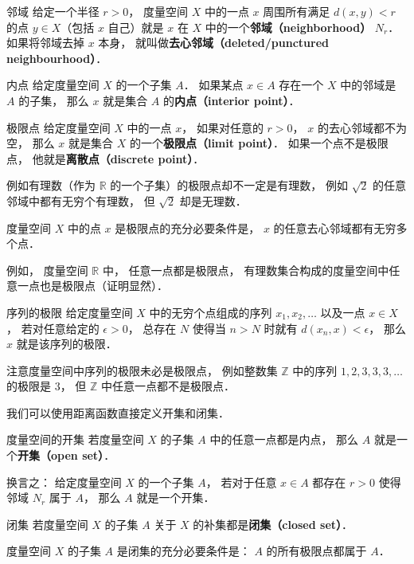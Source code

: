 \begin{definition}{邻域}
给定一个半径 $r > 0$， 度量空间 $X$ 中的一点 $x$ 周围所有满足 $d(x, y) < r$ 的点 $y \in X$（包括 $x$ 自己）就是 $x$ 在 $X$ 中的一个\textbf{邻域（neighborhood）} $N_r$． 如果将邻域去掉 $x$ 本身， 就叫做\textbf{去心邻域（deleted/punctured neighbourhood）}．
\end{definition}

\begin{definition}{内点}
给定度量空间 $X$ 的一个子集 $A$． 如果某点 $x\in A$ 存在一个 $X$ 中的邻域是 $A$ 的子集， 那么 $x$ 就是集合 $A$ 的\textbf{内点（interior point）}．
\end{definition}

\begin{definition}{极限点}
给定度量空间 $X$ 中的一点 $x$， 如果对任意的 $r > 0$， $x$ 的去心邻域都不为空， 那么 $x$ 就是集合 $X$ 的一个\textbf{极限点（limit point）}． 如果一个点不是极限点， 他就是\textbf{离散点（discrete point）}．
\end{definition}

例如有理数（作为 $\mathbb R$ 的一个子集）的极限点却不一定是有理数， 例如 $\sqrt{2}$ 的任意邻域中都有无穷个有理数， 但 $\sqrt{2}$ 却是无理数．

\begin{corollary}{}
度量空间 $X$ 中的点 $x$ 是极限点的充分必要条件是， $x$ 的任意去心邻域都有无穷多个点．
\end{corollary}

例如， 度量空间 $\mathbb R$ 中， 任意一点都是极限点， 有理数集合构成的度量空间中任意一点也是极限点（证明显然）．

\begin{definition}{序列的极限}
给定度量空间 $X$ 中的无穷个点组成的序列 $x_1, x_2, \dots$ 以及一点 $x \in X$， 若对任意给定的 $\epsilon > 0$， 总存在 $N$ 使得当 $n > N$ 时就有 $d(x_n, x) < \epsilon$， 那么 $x$ 就是该序列的极限．
\end{definition}
注意度量空间中序列的极限未必是极限点， 例如整数集 $\mathbb Z$ 中的序列 $1, 2, 3, 3, 3, \dots$ 的极限是 $3$， 但 $\mathbb Z$ 中任意一点都不是极限点．



我们可以使用距离函数直接定义开集和闭集．
\begin{definition}{度量空间的开集}
若度量空间 $X$ 的子集 $A$ 中的任意一点都是内点， 那么 $A$ 就是一个\textbf{开集（open set）}．

换言之： 给定度量空间 $X$ 的一个子集 $A$， 若对于任意 $x \in A$ 都存在 $r > 0$ 使得邻域 $N_r$ 属于 $A$， 那么 $A$ 就是一个开集．
\end{definition}

\begin{definition}{闭集}
若度量空间 $X$ 的子集 $A$ 关于 $X$ 的补集都是\textbf{闭集（closed set）}．
\end{definition}

\begin{theorem}{}
度量空间 $X$ 的子集 $A$ 是闭集的充分必要条件是： $A$ 的所有极限点都属于 $A$．
\end{theorem}
